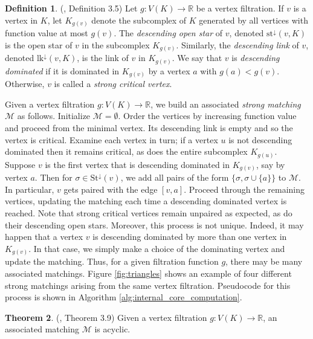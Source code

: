 \documentclass{amsart}
\theoremstyle{definition}
\newtheorem{theorem}{Theorem}[section]
\newtheorem{definition}[theorem]{Definition}
\newcommand{\zr}{{\mathbb R}}
\begin{document}
\begin{definition} (\cite{Fernandez2026}, Definition 3.5)
Let $g:V(K)\to\mathbb{R}$ be a vertex filtration. If $v$ is a vertex in $K$, let $K_{g(v)}$ denote the subcomplex of $K$ generated by all vertices with function value at most $g(v)$. The \textit{descending open star} of $v$, denoted $\textrm{st}^\downarrow(v,K)$ is the open star of $v$ in the subcomplex $K_{g(v)}$. Similarly, the \textit{descending link} of $v$, denoted $\textrm{lk}^\downarrow(v,K)$, is the link of $v$ in $K_{g(v)}$. We say that $v$ is \textit{descending dominated} if it is dominated in $K_{g(v)}$ by a vertex $a$ with $g(a)<g(v)$. Otherwise, $v$ is called a \textit{strong critical vertex}.
\end{definition}

 Given a vertex filtration $g:V(K)\to\zr$, we build an associated \textit{strong matching $\mathcal{M}$} as follows. Initialize ${\mathcal M}=\emptyset$. Order the vertices by increasing function value and proceed from the minimal vertex. Its descending link is empty and so the vertex is critical. Examine each vertex in turn; if a vertex $u$ is not descending dominated then it remains critical, as does the entire subcomplex $K_{g(u)}$. Suppose $v$ is the first vertex that is descending dominated in $K_{g(v)}$, say by vertex $a$. Then for $\sigma\in\text{St}^\downarrow(v)$, we add all pairs of the form $\{\sigma,\sigma\cup\{a\}\}$ to ${\mathcal M}$. In particular, $v$ gets paired with the edge $[v,a]$. Proceed through the remaining vertices, updating the matching each time a descending dominated vertex is reached.  Note that strong critical vertices remain unpaired as expected, as do their descending open stars. Moreover, this process is not unique. Indeed, it may happen that a vertex $v$ is descending dominated by more than one vertex in $K_{g(v)}$. In that case, we simply make a choice of the dominating vertex and update the matching. Thus, for a given filtration function $g$, there may be many associated matchings. Figure \ref{fig:triangles} shows an example of four different strong matchings arising from the same vertex filtration. Pseudocode for this process is shown in Algorithm \ref{alg:internal_core_computation}. 

\begin{theorem} (\cite{Fernandez2026}, Theorem 3.9)
    Given a vertex filtration $g:V(K)\to\zr$, an associated matching ${\mathcal M}$ is acyclic.
\end{theorem}
 
\end{document}
